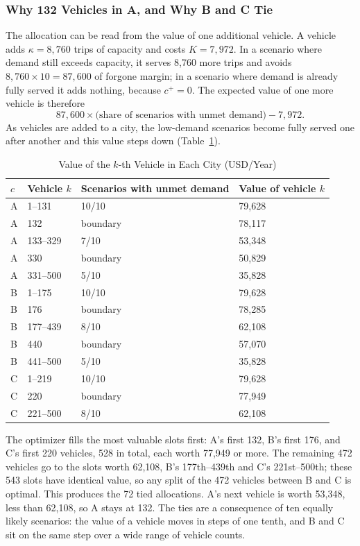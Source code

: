 \documentclass[10pt,a4paper]{article}
\begin{document}
\subsubsection{Why 132 Vehicles in A, and Why B and C Tie}
The allocation can be read from the value of one additional vehicle. A vehicle adds $\kappa=8{,}760$ trips of capacity and costs $K=7{,}972$.
In a scenario where demand still exceeds capacity, it serves 8{,}760 more trips and avoids $8{,}760\times10=87{,}600$ of forgone margin; in a scenario where demand is already fully served it adds nothing, because $c^+=0$.
The expected value of one more vehicle is therefore
\[
87{,}600\times\bigl(\text{share of scenarios with unmet demand}\bigr)-7{,}972 .
\]
As vehicles are added to a city, the low-demand scenarios become fully served one after another and this value steps down (Table~\ref{tab:an-ladder}).
\begin{table}[H]
\centering\small
\caption{Value of the $k$-th Vehicle in Each City (USD/Year)}\label{tab:an-ladder}
\begin{tabular}{llll}
\toprule
$c$ & Vehicle $k$ & Scenarios with unmet demand & Value of vehicle $k$\\\midrule
A & 1--131 & 10/10 & 79,628\\
A & 132 & boundary & 78,117\\
A & 133--329 & 7/10 & 53,348\\
A & 330 & boundary & 50,829\\
A & 331--500 & 5/10 & 35,828\\
B & 1--175 & 10/10 & 79,628\\
B & 176 & boundary & 78,285\\
B & 177--439 & 8/10 & 62,108\\
B & 440 & boundary & 57,070\\
B & 441--500 & 5/10 & 35,828\\
C & 1--219 & 10/10 & 79,628\\
C & 220 & boundary & 77,949\\
C & 221--500 & 8/10 & 62,108\\
\bottomrule
\end{tabular}
\end{table}
The optimizer fills the most valuable slots first: A's first 132, B's first 176, and C's first 220 vehicles, 528 in total, each worth 77{,}949 or more.
The remaining 472 vehicles go to the slots worth 62{,}108, B's 177th--439th and C's 221st--500th; these 543 slots have identical value, so any split of the 472 vehicles between B and C is optimal.
This produces the 72 tied allocations. A's next vehicle is worth 53{,}348, less than 62{,}108, so A stays at 132.
The ties are a consequence of ten equally likely scenarios: the value of a vehicle moves in steps of one tenth, and B and C sit on the same step over a wide range of vehicle counts.
\end{document}
